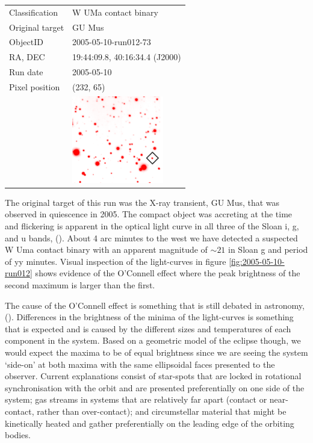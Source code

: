   \begin{tabular}{l l}
  Classification & {W UMa} contact binary \\
  Original target & GU Mus \\
  ObjectID & 2005-05-10-run012-73 \\
  RA, DEC & 19:44:09.8, 40:16:34.4 (J2000) \\
  Run date & 2005-05-10 \\
  Pixel position & (232, 65) \\
   & \includegraphics[width=40mm]{images/2005-05-10-run012-73.png} \\
  \end{tabular}
  
  The original target of this run was the X-ray transient, {GU Mus}, that was observed in quiescence in 2005. The compact object was accreting at the time and flickering is apparent in the optical light curve in all three of the Sloan i, g, and u bands, (\cite{tariq2010}). About 4 arc minutes to the west we have detected a suspected {W Uma} contact binary with an apparent magnitude of $\sim21$ in Sloan g and period of yy minutes. Visual inspection of the light-curves in figure \ref{fig:2005-05-10-run012} shows evidence of the O'Connell effect where the peak brightness of the second maximum is larger than the first. 

The cause of the O'Connell effect is something that is still debated in astronomy, (\cite{oconnelleffect}). Differences in the brightness of the minima of the light-curves is something that is expected and is caused by the different sizes and temperatures of each component in the system. Based on a geometric model of the eclipse though, we would expect the maxima to be of equal brightness since we are seeing the system `side-on' at both maxima with the same ellipsoidal faces presented to the observer. Current explanations consist of star-spots that are locked in rotational synchronisation with the orbit and are presented preferentially on one side of the system; gas streams in systems that are relatively far apart (contact or near-contact, rather than over-contact); and circumstellar material that might be kinetically heated and gather preferentially on the leading edge of the orbiting bodies.  


